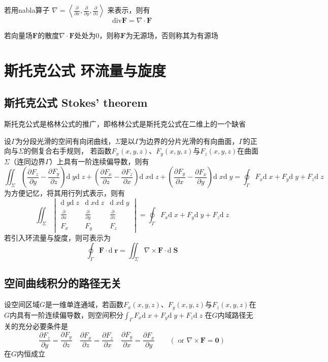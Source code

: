 \documentclass[UTF8]{ctexart}
\newcommand{\cross}{\times}
\newcommand{\dif}[1]{{\mathrm{d}\;\!#1}}
\newcommand{\ve}[1]{{\bm{#1}}}
\newcommand{\emplin}{\vspace{1em}}
\begin{document}
若用nabla算子
$\displaystyle\nabla=\left\langle\frac{\partial}{\partial x},\frac{\partial}{\partial y},\frac{\partial}{\partial z}\right\rangle$
来表示，则有
\[\text{div}\ve{F}=\nabla\cdot\ve{F}\]

若向量场$\ve{F}$的散度$\nabla\cdot\ve{F}$处处为$0$，则称$\ve{F}$为无源场，否则称其为有源场

\section*{斯托克公式 环流量与旋度}
\subsection*{斯托克公式 Stokes' theorem}
斯托克公式是格林公式的推广，即格林公式是斯托克公式在二维上的一个缺省

\emplin

设$\Gamma$为分段光滑的空间有向闭曲线，$\Sigma$是以$\Gamma$为边界的分片光滑的有向曲面，$\Gamma$的正向与$\Sigma$的侧复合右手规则，
若函数$F_x(x,y,z)$、$F_y(x,y,z)$与$F_z(x,y,z)$在曲面$\Sigma$（连同边界$\Gamma$）上具有一阶连续偏导数，则有
\[\iint_\Sigma
\left( \frac{\partial F_z}{\partial y} - \frac{\partial F_y}{\partial z} \right)\dif{y}\dif{z}+
\left( \frac{\partial F_x}{\partial z} - \frac{\partial F_z}{\partial x} \right)\dif{x}\dif{z}+
\left( \frac{\partial F_y}{\partial x} - \frac{\partial F_x}{\partial y} \right)\dif{x}\dif{y}
=
\oint_\Gamma F_x\dif{x}+F_y\dif{y}+F_z\dif{z}
 \]
为方便记忆，将其用行列式表示，则有
\[\iint_\Sigma \begin{vmatrix}
\dif{y}\dif{z}&\dif{x}\dif{z}&\dif{x}\dif{y}\\
\frac{\partial}{\partial x}&\frac{\partial}{\partial y}&\frac{\partial}{\partial z}\\
F_x&F_y&F_z
\end{vmatrix}
=
\oint_\Gamma F_x\dif{x}+F_y\dif{y}+F_z\dif{z}
\]
若引入环流量与旋度，则可表示为
\[\oint_\Gamma \ve{F}\cdot\dif{\ve{r}}=\iint_\Sigma \nabla\cross\ve{F}\cdot\dif{\ve{S}}\]

\subsection*{空间曲线积分的路径无关}
设空间区域$G$是一维单连通域，若函数$F_x(x,y,z)$、$F_y(x,y,z)$与$F_z(x,y,z)$在$G$内具有一阶连续偏导数，则空间积分$\int_\Gamma F_x\dif{x}+F_y\dif{y}+F_z\dif{z}$
在$G$内域路径无关的充分必要条件是
\[
\frac{\partial F_z}{\partial y} = \frac{\partial F_y}{\partial z}\quad
\frac{\partial F_x}{\partial z} = \frac{\partial F_z}{\partial x}\quad
\frac{\partial F_y}{\partial x} = \frac{\partial F_x}{\partial y}\quad
\quad\left(\text{ or }\nabla\cross\ve{F}=\ve{0}\right)
\]
在$G$内恒成立
\end{document}

